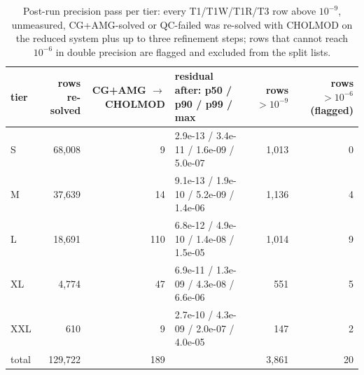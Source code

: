 \begin{table}[tb]
\centering
\scriptsize
\setlength{\tabcolsep}{3.5pt}
\caption{Post-run precision pass per tier: every T1/T1W/T1R/T3 row above $10^{-9}$, unmeasured, CG+AMG-solved or QC-failed was re-solved with CHOLMOD on the reduced system plus up to three refinement steps; rows that cannot reach $10^{-6}$ in double precision are flagged and excluded from the split lists.}
\label{tab:precision}
\setlength{\tabcolsep}{2.2pt}
\begin{tabular}{lrrlrr}
\toprule
tier & rows re-solved & CG+AMG $\rightarrow$ CHOLMOD & residual after: p50 / p90 / p99 / max & rows $> 10^{-9}$ & rows $> 10^{-6}$ (flagged) \\
\midrule
S & 68,008 & 9 & 2.9e-13 / 3.4e-11 / 1.6e-09 / 5.0e-07 & 1,013 & 0 \\
M & 37,639 & 14 & 9.1e-13 / 1.9e-10 / 5.2e-09 / 1.4e-06 & 1,136 & 4 \\
L & 18,691 & 110 & 6.8e-12 / 4.9e-10 / 1.4e-08 / 1.5e-05 & 1,014 & 9 \\
XL & 4,774 & 47 & 6.9e-11 / 1.3e-09 / 4.3e-08 / 6.6e-06 & 551 & 5 \\
XXL & 610 & 9 & 2.7e-10 / 4.3e-09 / 2.0e-07 / 4.0e-05 & 147 & 2 \\
total & 129,722 & 189 &  & 3,861 & 20 \\
\bottomrule
\end{tabular}
\end{table}
